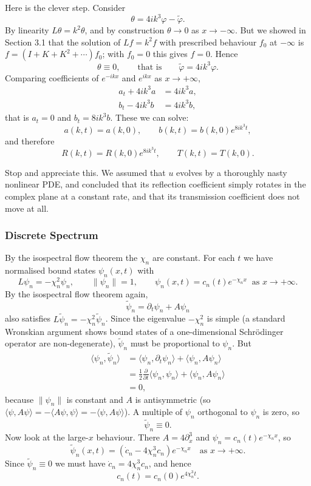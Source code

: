\documentclass[a4paper]{scrartcl}
\newcommand{\ip}[2]{\langle #1, #2 \rangle}
\begin{document}
Here is the clever step. Consider
$$
\theta = 4ik^3\varphi - \tilde\varphi.
$$
By linearity $L\theta = k^2\theta$, and by construction $\theta\to 0$ as $x\to-\infty$. But we showed in Section 3.1 that the solution of $Lf = k^2f$ with prescribed behaviour $f_0$ at $-\infty$ is $f = (I + K + K^2+\cdots)f_0$; with $f_0 = 0$ this gives $f = 0$. Hence
$$
\theta \equiv 0, \qquad\text{that is}\qquad \tilde\varphi = 4ik^3\varphi.
$$
Comparing coefficients of $e^{-ikx}$ and $e^{ikx}$ as $x\to+\infty$,
\begin{align*}
	a_t + 4ik^3a &= 4ik^3a,\\
	b_t - 4ik^3b &= 4ik^3b,
\end{align*}
that is $a_t = 0$ and $b_t = 8ik^3b$. These we can solve:
$$
a(k,t) = a(k,0), \qquad b(k,t) = b(k,0)e^{8ik^3t},
$$
and therefore
$$
\boxed{R(k,t) = R(k,0)e^{8ik^3t}, \qquad T(k,t) = T(k,0).}
$$

Stop and appreciate this. We assumed that $u$ evolves by a thoroughly nasty nonlinear PDE, and concluded that its reflection coefficient simply rotates in the complex plane at a constant rate, and that its transmission coefficient does not move at all.

\subsubsection{Discrete Spectrum}

By the isospectral flow theorem the $\chi_n$ are constant. For each $t$ we have normalised bound states $\psi_n(x,t)$ with
$$
L\psi_n = -\chi_n^2\psi_n, \qquad \|\psi_n\| = 1, \qquad \psi_n(x,t) = c_n(t)e^{-\chi_n x}\ \text{ as } x\to+\infty.
$$
By the isospectral flow theorem again,
$$
\tilde\psi_n = \partial_t\psi_n + A\psi_n
$$
also satisfies $L\tilde\psi_n = -\chi_n^2\tilde\psi_n$. Since the eigenvalue $-\chi_n^2$ is simple (a standard Wronskian argument shows bound states of a one-dimensional Schr\"odinger operator are non-degenerate), $\tilde\psi_n$ must be proportional to $\psi_n$. But
\begin{align*}
	\ip{\psi_n}{\tilde\psi_n} &= \ip{\psi_n}{\partial_t\psi_n} + \ip{\psi_n}{A\psi_n}\\
	&= \frac{1}{2}\frac{\partial}{\partial t}\ip{\psi_n}{\psi_n} + \ip{\psi_n}{A\psi_n}\\
	&= 0,
\end{align*}
because $\|\psi_n\|$ is constant and $A$ is antisymmetric (so $\ip{\psi}{A\psi} = -\ip{A\psi}{\psi} = -\ip{\psi}{A\psi}$). A multiple of $\psi_n$ orthogonal to $\psi_n$ is zero, so
$$
\tilde\psi_n \equiv 0.
$$
Now look at the large-$x$ behaviour. There $A = 4\partial_x^3$ and $\psi_n = c_n(t)e^{-\chi_nx}$, so
$$
\tilde\psi_n(x,t) = \left(\dot c_n - 4\chi_n^3c_n\right)e^{-\chi_nx}\quad\text{as }x\to+\infty.
$$
Since $\tilde\psi_n\equiv 0$ we must have $\dot c_n = 4\chi_n^3c_n$, and hence
$$
\boxed{c_n(t) = c_n(0)e^{4\chi_n^3t}.}
$$
\end{document}
